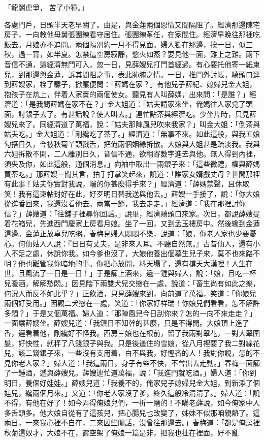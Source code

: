 「龍鬬虎爭，  苦了小獐。」

各處門戶，日頭半天老早關了。由是，與金蓮兩個恩情又間隔阻了。經濟那邊陳宅房子，一向教他母舅張團練看守居住。張團練革任，在家間住。經濟早晚往那裡吃飯去。月娘亦不追問。兩個隔別約一月不得見面。婦人獨在那邊，挨一日，似三秋，過一宵，如半夏。怎禁這空房寂靜，慾火如蒸？要見他一面，難上之難。兩下音信不通，這經濟無門可入，忽一日，見薛嫂兒打門首經過。有心要托他寄一紙柬兒，到那邊與金蓮，訴其間阻之事，表此肺腑之情。一日，推門外討帳，騎頭口逕到薛嫂家，栓了騾子，掀簾便問：「薛媽在家？」有他兒子薛紀、媳婦兒金大姐，抱孩子在炕上，伴着人家賣的兩個使女。聽見有人叫薛媽，出來問：「是誰？」經濟道：「是我問薛媽在家不在？」金大姐道：「姑夫請家來坐，俺媽往人家兌了頭面，討銀子去了。有甚話說？使人叫去。」連忙點茶與經濟吃。少坐片時，只見薛嫂兒來了。同經濟道了萬福，說：「姑夫那陣風兒吹來我家？」叫金大姐：「倒茶與姑夫吃。」金大姐道：「剛纔吃了茶了。」經濟道：「無事不來。如此這般，與我五娘勾搭日久，今被秋菊丫頭戮舌，把俺兩個姻緣拆散。大娘與大姐甚是疏淡我。我與六姐拆散不開，二人離別日久，音信不通，欲稍寄數字進去與他。無人得到內裡，須央及你，如此這般，通個消息。」向袖中取出一兩銀子來：「這些微禮，權與薛媽買茶吃。」那薛嫂一聞其言，拍手打掌笑起來，說道：「誰家女婿戲丈母？世間那裡有此事！姑夫你實對我說，端的你甚麼得手來？」經濟道：「薛媽禁聲，且休取笑！我有這柬帖封好在此，好歹明日替我送與他去。」薛嫂一手接了，說：「你大娘從進香回來，我還沒看他去。兩當一節，我去走走。」經濟道：「我在那裡討你信？」薛嫂道：「往舖子裡尋你回話。」說畢，經濟騎頭口來家。次日，都說薛嫂提着花箱兒，先進西門慶家上房看月娘。坐了一回，又到孟玉樓房中。然後纔到金蓮這邊。金蓮正放卓兒吃粥。春梅見婦人悶悶不樂，說道：「娘，你老人家也少要憂心。何仙姑人人說：『日日有丈夫，是非來入耳。不聽自然無。』古昔仙人，還有小人不足之處，休說你我。如今爹也沒了，大娘他養出個墓生兒子來，莫不也來路不明？他也難管我你暗地的事。你把心放開，料天塌了，還有撐天大漢哩！人生在世，且風流了一日是一日！」于是篩上酒來，遞一鍾與婦人，說：「娘，且吃一杯兒暖酒，解解愁悶。」因見階下兩雙犬兒交戀在一處，說道：「畜生尚有如此之樂，何況人而反不如此乎？」正飲酒，只見薛嫂來到，向前道了萬福，笑道：「你娘兒兩個好受用。」因觀二犬戀在一處，笑道：「你家好祥瑞！你娘兒們看看，怎不解許多悶？」于是又個萬福。婦人道：「那陣風兒今日刮你來？怎的一向不來走走？」一面讓薛嫂坐。薛嫂兒道：「我鎮日不知幹的甚麼，只是不得閒。大娘頂上進了香，遲看着他，剛纔好不怪我。西房三娘也在根前，留了我兩對翠花，一對大翠圍髮，好快性，就秤了八錢銀子與我。只是後邊住的雪娘，從八月裡要了我二對線花兒，該二錢銀子來，一些沒有支用着，白不與我，好慳吝的人！我對你說，怎的不見你老人家？」婦人道：「我這兩日，身子有些不快，不曾出去走動。」春梅一面篩了一鍾酒，遞與薛嫂兒。薛嫂連忙道萬福，說：「我進門就吃酒。」婦人道：「你到明日，養個好娃娃。」薛嫂兒道：「我養不的，俺家兒子媳婦兒金大姐，到新添了個娃兒，纔兩個月來。」又道：「你老人家沒了爹，終久這般冷清清了。」婦人道：「說不得，有他在好了！如今弄得俺娘兒們，一折一磨的！不瞞老薛說，如今俺家中人多舌頭多。他大娘自從有了這孩兒，把心腸兒也改變了，姊妹不似那咱親熱了。這兩日，一來我心裡不自在，二來因些閒話，沒曾往那邊去。」春梅道：「都是俺房裡秋菊這奴才，大娘不在，霹空架了俺娘一篇是非，把我也扯在裡面，好不亂
